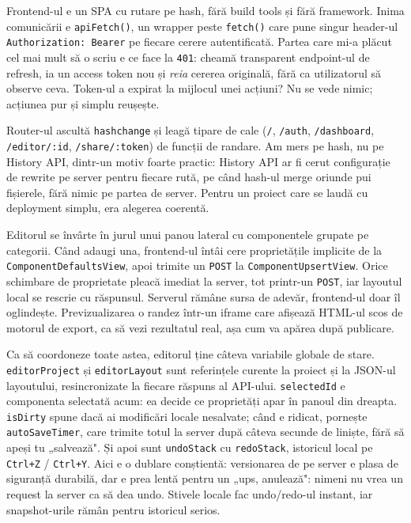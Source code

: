 \documentclass[12pt,a4paper]{report}
\begin{document}
Frontend-ul e un SPA cu rutare pe hash, fără build tools și fără framework. Inima
comunicării e \texttt{apiFetch()}, un wrapper peste \texttt{fetch()} care pune singur
header-ul \texttt{Authorization: Bearer} pe fiecare cerere autentificată. Partea care
mi-a plăcut cel mai mult să o scriu e ce face la \texttt{401}: cheamă transparent
endpoint-ul de refresh, ia un access token nou și \emph{reia} cererea originală, fără
ca utilizatorul să observe ceva. Token-ul a expirat la mijlocul unei acțiuni? Nu se
vede nimic; acțiunea pur și simplu reușește.

Router-ul ascultă \texttt{hashchange} și leagă tipare de cale (\texttt{/},
\texttt{/auth}, \texttt{/dashboard}, \texttt{/editor/:id}, \texttt{/share/:token}) de
funcții de randare. Am mers pe hash, nu pe History API, dintr-un motiv foarte practic:
History API ar fi cerut configurație de rewrite pe server pentru fiecare rută, pe când
hash-ul merge oriunde pui fișierele, fără nimic pe partea de server. Pentru un proiect
care se laudă cu deployment simplu, era alegerea coerentă.

Editorul se învârte în jurul unui panou lateral cu componentele grupate pe categorii.
Când adaugi una, frontend-ul întâi cere proprietățile implicite de la
\texttt{ComponentDefaultsView}, apoi trimite un \texttt{POST} la
\texttt{ComponentUpsertView}. Orice schimbare de proprietate pleacă imediat la server,
tot printr-un \texttt{POST}, iar layoutul local se rescrie cu răspunsul. Serverul
rămâne sursa de adevăr, frontend-ul doar îl oglindește. Previzualizarea o randez
într-un iframe care afișează HTML-ul scos de motorul de export, ca să vezi
rezultatul real, așa cum va apărea după publicare.

Ca să coordoneze toate astea, editorul ține câteva variabile globale de stare.
\texttt{editorProject} și \texttt{editorLayout} sunt referințele curente la proiect și
la JSON-ul layoutului, resincronizate la fiecare răspuns al API-ului. \texttt{selectedId}
e componenta selectată acum: ea decide ce proprietăți apar în panoul din dreapta.
\texttt{isDirty} spune dacă ai modificări locale nesalvate; când e ridicat, pornește
\texttt{autoSaveTimer}, care trimite totul la server după câteva secunde de liniște,
fără să apeși tu „salvează". Și apoi sunt \texttt{undoStack} cu \texttt{redoStack},
istoricul local pe \texttt{Ctrl+Z} / \texttt{Ctrl+Y}. Aici e o dublare conștientă:
versionarea de pe server e plasa de siguranță durabilă, dar e prea lentă pentru un
„ups, anulează": nimeni nu vrea un request la server ca să dea undo. Stivele locale
fac undo/redo-ul instant, iar snapshot-urile rămân pentru istoricul serios.
\end{document}
